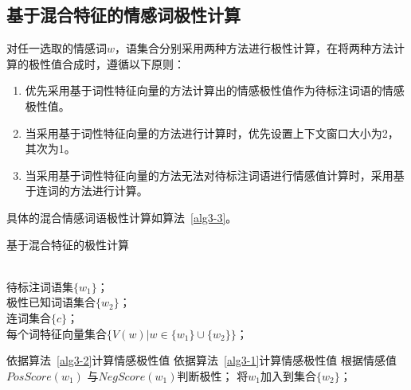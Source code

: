 \subsection{基于混合特征的情感词极性计算}
对任一选取的情感词$ w $，语集合分别采用两种方法进行极性计算，在将两种方法计算的极性值合成时，遵循以下原则：
\begin{enumerate}
\item 优先采用基于词性特征向量的方法计算出的情感极性值作为待标注词语的情感极性值。
\item 当采用基于词性特征向量的方法进行计算时，优先设置上下文窗口大小为2，其次为1。
\item 当采用基于词性特征向量的方法无法对待标注词语进行情感值计算时，采用基于连词的方法进行计算。
\end{enumerate}

具体的混合情感词语极性计算如算法~\ref{alg3-3}。
\begin{algorithm}[htp]
\caption{基于混合特征的极性计算}
\label{alg3-3}
\begin{algorithmic}[1]
\REQUIRE ~~\\
待标注词语集$\{w_1\}$；\\
极性已知词语集合$\{w_2\}$；\\
连词集合$\{c\}$；\\
每个词特征向量集合$\{V(w)|w \in \{w_1\}\cup \{w_2\} \}$；

\STATE 依据算法~\ref{alg3-2}计算情感极性值
\STATE 依据算法~\ref{alg3-1}计算情感极性值
\ENDIF
\STATE 根据情感值 $PosScore(w_1)$ 与$ NegScore(w_1) $判断极性；
\STATE 将$ w_1 $加入到集合$ \{w_2\} $；
\ENDFOR
\end{algorithmic}
\end{algorithm}

